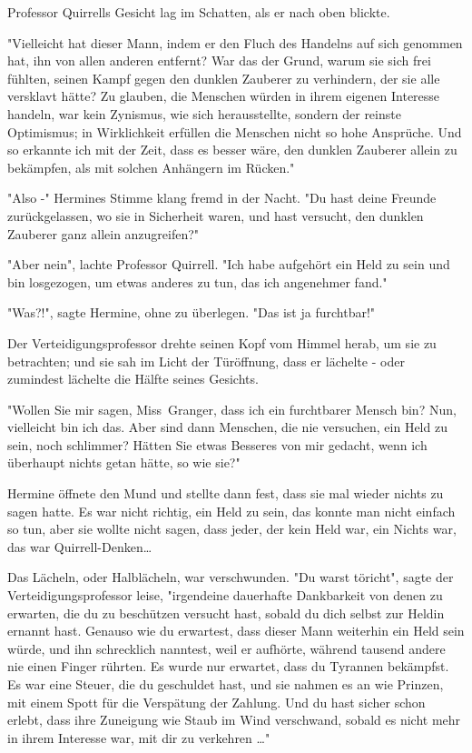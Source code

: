 {Professor Quirrells Gesicht lag im Schatten, als er nach oben blickte.

"Vielleicht hat dieser Mann, indem er den Fluch des Handelns auf sich genommen hat, ihn von allen anderen entfernt? War das der Grund, warum sie sich frei fühlten, seinen Kampf gegen den dunklen Zauberer zu verhindern, der sie alle versklavt hätte? Zu glauben, die Menschen würden in ihrem eigenen Interesse handeln, war kein Zynismus, wie sich herausstellte, sondern der reinste Optimismus; in Wirklichkeit erfüllen die Menschen nicht so hohe Ansprüche. Und so erkannte ich mit der Zeit, dass es besser wäre, den dunklen Zauberer allein zu bekämpfen, als mit solchen Anhängern im Rücken."

"Also -" Hermines Stimme klang fremd in der Nacht. "Du hast deine Freunde zurückgelassen, wo sie in Sicherheit waren, und hast versucht, den dunklen Zauberer ganz allein anzugreifen?"

"Aber nein", lachte Professor Quirrell. "Ich habe aufgehört ein Held zu sein und bin losgezogen, um etwas anderes zu tun, das ich angenehmer fand."

"Was?!", sagte Hermine, ohne zu überlegen. "Das ist ja furchtbar!"

Der Verteidigungsprofessor drehte seinen Kopf vom Himmel herab, um sie zu betrachten; und sie sah im Licht der Türöffnung, dass er lächelte - oder zumindest lächelte die Hälfte seines Gesichts.

"Wollen Sie mir sagen, Miss~Granger, dass ich ein furchtbarer Mensch bin? Nun, vielleicht bin ich das. Aber sind dann Menschen, die nie versuchen, ein Held zu sein, noch schlimmer? Hätten Sie etwas Besseres von mir gedacht, wenn ich überhaupt nichts getan hätte, so wie sie?"

Hermine öffnete den Mund und stellte dann fest, dass sie mal wieder nichts zu sagen hatte. Es war nicht richtig, ein Held zu sein, das konnte man nicht einfach so tun, aber sie wollte nicht sagen, dass jeder, der kein Held war, ein Nichts war, das war Quirrell-Denken…

Das Lächeln, oder Halblächeln, war verschwunden. "Du warst töricht", sagte der Verteidigungsprofessor leise, "irgendeine dauerhafte Dankbarkeit von denen zu erwarten, die du zu beschützen versucht hast, sobald du dich selbst zur Heldin ernannt hast. Genauso wie du erwartest, dass dieser Mann weiterhin ein Held sein würde, und ihn schrecklich nanntest, weil er aufhörte, während tausend andere nie einen Finger rührten. Es wurde nur erwartet, dass du Tyrannen bekämpfst. Es war eine Steuer, die du geschuldet hast, und sie nahmen es an wie Prinzen, mit einem Spott für die Verspätung der Zahlung. Und du hast sicher schon erlebt, dass ihre Zuneigung wie Staub im Wind verschwand, sobald es nicht mehr in ihrem Interesse war, mit dir zu verkehren …"

}
